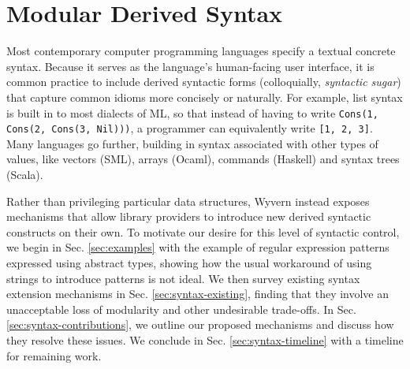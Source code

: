 
\section{Modular Derived Syntax}\label{sec:syntax}
Most contemporary computer programming languages specify a textual concrete syntax. Because it serves as the language's human-facing user interface, it is common practice to include  derived syntactic forms (colloquially, \emph{syntactic sugar}) that capture common idioms more concisely or naturally. %
For example,  list syntax is built in to most dialects of ML, so that instead of having to write \lstinline{Cons(1, Cons(2, Cons(3, Nil)))}, a programmer can equivalently write \lstinline{[1, 2, 3]}. Many languages go further, building in syntax associated with other types of values, like vectors (SML), arrays (Ocaml), commands (Haskell) and syntax trees (Scala).  %

Rather than privileging  particular data structures, Wyvern instead exposes mechanisms that allow library providers to introduce new derived syntactic constructs on their own. %
To motivate our desire for this level of syntactic control, we begin in Sec. \ref{sec:examples} with the example of regular expression patterns expressed using abstract types, showing how the usual workaround of using strings to introduce patterns is not ideal. We then survey existing syntax extension mechanisms in Sec. \ref{sec:syntax-existing}, finding that they involve an unacceptable loss of modularity and other undesirable trade-offs. In Sec. \ref{sec:syntax-contributions}, we outline our proposed mechanisms and discuss how they resolve these issues. We conclude in Sec. \ref{sec:syntax-timeline} with a timeline for remaining work.


